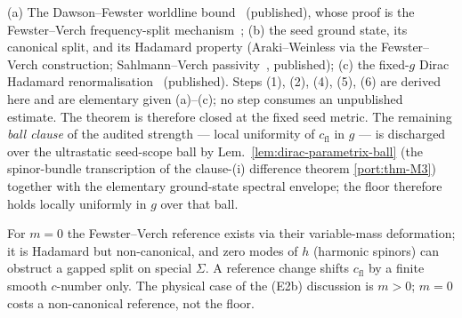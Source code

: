 \begin{remark}
\label{rem:dsf-imports}
(a) The Dawson--Fewster worldline bound~\cite{DawsonFewster2006}
(published), whose proof is the Fewster--Verch frequency-split
mechanism~\cite{FewsterVerch2001}; (b) the seed ground state, its
canonical split, and its Hadamard property (Araki--Weinless via the
Fewster--Verch construction; Sahlmann--Verch
passivity~\cite{SahlmannVerch2000}, published); (c) the fixed-$g$
Dirac Hadamard renormalisation~\cite{DappiaggiHackPinamonti2009}
(published). Steps (1), (2), (4), (5), (6) are derived here and are
elementary given (a)--(c); no step consumes an unpublished estimate.
The theorem is therefore closed at the fixed seed metric. The
remaining \emph{ball clause} of the audited strength --- local
uniformity of $c_{\mathrm{fl}}$ in $g$ --- is discharged over the
ultrastatic seed-scope ball by Lem.~\ref{lem:dirac-parametrix-ball}
(the spinor-bundle transcription of the clause-(i) difference theorem
\ref{port:thm-M3}) together with the elementary ground-state spectral
envelope; the floor therefore holds locally uniformly in $g$ over that
ball.
\end{remark}

\begin{remark}
\label{rem:dsf-massless}
For $m=0$ the Fewster--Verch reference exists via their
variable-mass deformation; it is Hadamard but non-canonical, and
zero modes of $h$ (harmonic spinors) can obstruct a gapped split on
special $\Sigma$. A reference change shifts $c_{\mathrm{fl}}$ by a
finite smooth $c$-number only. The physical case of the (E2b)
discussion is $m>0$; $m=0$ costs a non-canonical reference, not the
floor.
\end{remark}
